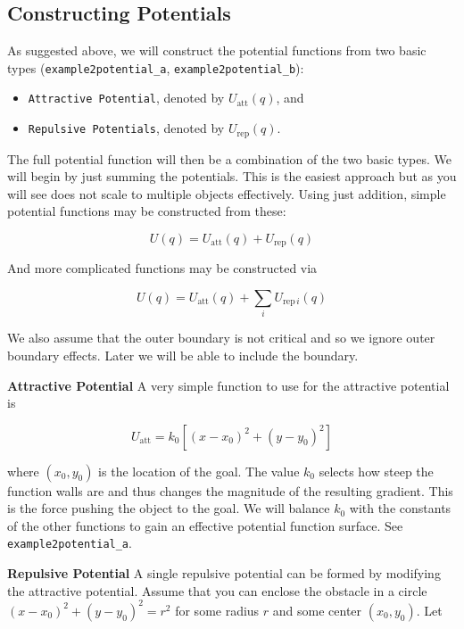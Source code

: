 \hypertarget{constructing-potentials}{%
\subsection{Constructing Potentials}\label{constructing-potentials}}

As suggested above, we will construct the potential functions from two
basic types (\texttt{example2potential\_a},
\texttt{example2potential\_b}):

\begin{itemize}
\tightlist
\item
  \texttt{Attractive\ Potential}, denoted by \(U_\text{att}(q)\), and
\item
  \texttt{Repulsive\ Potentials}, denoted by \(U_\text{rep}(q)\).
\end{itemize}

The full potential function will then be a combination of the two basic
types. We will begin by just summing the potentials. This is the easiest
approach but as you will see does not scale to multiple objects
effectively. Using just addition, simple potential functions may be
constructed from these:

\[U(q) = U_\text{att}(q) + U_\text{rep}(q)\]

And more complicated functions may be constructed via

\[U(q) = U_\text{att}(q) + \sum_i U_{\text{rep}\, i}(q)\]

We also assume that the outer boundary is not critical and so we ignore
outer boundary effects. Later we will be able to include the boundary.

\textbf{Attractive Potential} A very simple function to use for the
attractive potential is

\[U_\text{att} = k_0\left[(x-x_0)^2 + (y-y_0)^2\right]\]

where \((x_0, y_0)\) is the location of the goal. The value \(k_0\)
selects how steep the function walls are and thus changes the magnitude
of the resulting gradient. This is the force pushing the object to the
goal. We will balance \(k_0\) with the constants of the other functions
to gain an effective potential function surface. See
\texttt{example2potential\_a}.

\textbf{Repulsive Potential} A single repulsive potential can be formed
by modifying the attractive potential. Assume that you can enclose the
obstacle in a circle \((x-x_0)^2 + (y-y_0)^2 = r^2\) for some radius
\(r\) and some center \((x_0,y_0)\). Let

